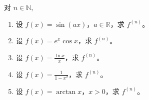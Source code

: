 \documentclass[../../main.tex]{subfiles}
\begin{document}
\begin{example}
对 \( n \in \mathbb{N} \),
\begin{enumerate}[(1)]
\item 设 \( f(x) = \sin(ax) \)，\( a \in \mathbb{R} \)，求 \( f^{(n)} \)。

\item 设 \( f(x) = e^x \cos x \)，求 \( f^{(n)} \)。

\item 设 \( f(x) = \frac{\ln x}{x} \)，求 \( f^{(n)} \)。

\item 设 \( f(x) = \frac{1}{1 - x^2} \)，求 \( f^{(n)} \)。

\item 设 \( f(x) = \arctan x \)，\( x > 0 \)，求 \( f^{(n)} \)。
\end{enumerate}
\end{example}
\end{document}

